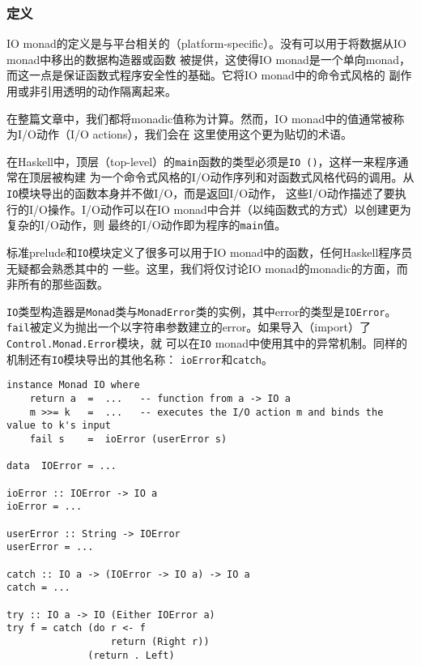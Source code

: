 \vspace{-0.5em}
\subsubsection{定义}
\vspace{-0.5em}
\indent{}IO monad的定义是与平台相关的（platform-specific）。没有可以用于将数据从IO monad中移出的数据构造器或函数
被提供，这使得IO monad是一个单向monad，而这一点是保证函数式程序安全性的基础。它将IO monad中的命令式风格的
副作用或非引用透明的动作隔离起来。

\indent{}在整篇文章中，我们都将monadic值称为计算。然而，IO monad中的值通常被称为I/O动作（I/O actions），我们会在
这里使用这个更为贴切的术语。

\indent{}在Haskell中，顶层（top-level）的\texttt{main}函数的类型必须是\texttt{IO ()}，这样一来程序通常在顶层被构建
为一个命令式风格的I/O动作序列和对函数式风格代码的调用。从\texttt{IO}模块导出的函数本身并不做I/O，而是返回I/O动作，
这些I/O动作描述了要执行的I/O操作。I/O动作可以在IO monad中合并（以纯函数式的方式）以创建更为复杂的I/O动作，则
最终的I/O动作即为程序的\texttt{main}值。

\indent{}标准prelude和\texttt{IO}模块定义了很多可以用于IO monad中的函数，任何Haskell程序员无疑都会熟悉其中的
一些。这里，我们将仅讨论IO monad的monadic的方面，而非所有的那些函数。

\indent{}\texttt{IO}类型构造器是\texttt{Monad}类与\texttt{MonadError}类的实例，其中error的类型是\texttt{IOError}。
\texttt{fail}被定义为抛出一个以字符串参数建立的error。如果导入（import）了\texttt{Control.Monad.Error}模块，就
可以在\texttt{IO} monad中使用其中的异常机制。同样的机制还有\texttt{IO}模块导出的其他名称：
\texttt{ioError}和\texttt{catch}。
\begin{verbatim}
instance Monad IO where
    return a  =  ...   -- function from a -> IO a
    m >>= k   =  ...   -- executes the I/O action m and binds the value to k's input
    fail s    =  ioError (userError s)

data  IOError = ...

ioError :: IOError -> IO a
ioError = ...

userError :: String -> IOError
userError = ...

catch :: IO a -> (IOError -> IO a) -> IO a
catch = ...

try :: IO a -> IO (Either IOError a)
try f = catch (do r <- f
                  return (Right r))
              (return . Left)
\end{verbatim}

